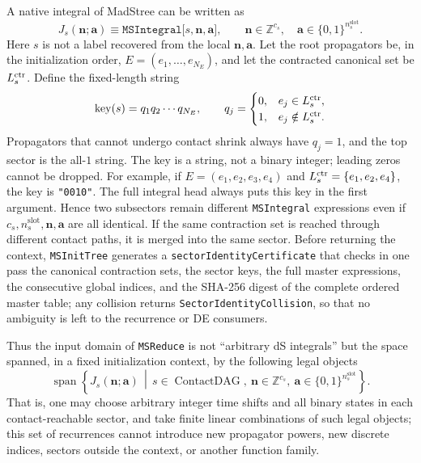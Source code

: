 \documentclass[11pt,a4paper]{article}
\begin{document}
A native integral of MadStree can be written as
\begin{equation}
 J_s(\bm n;\bm a)
 \equiv\texttt{MSIntegral[}s,\bm n,\bm a\texttt{]},
 \qquad
 \bm n\in\mathbb Z^{c_s},
 \quad
 \bm a\in\{0,1\}^{n_s^{\mathrm{slot}}}.
 \label{eq:MSIntegral-domain}
\end{equation}
Here $s$ is not a label recovered from the local $\bm n,\bm a$. Let the root propagators be, in the initialization order,
$E=(e_1,\ldots,e_{N_E})$, and let the contracted canonical set be $L_s^{\rm ctr}$. Define the fixed-length string
\begin{equation}
 \operatorname{key}(s)=q_1q_2\cdots q_{N_E},\qquad
 q_j=\begin{cases}0,&e_j\in L_s^{\rm ctr},\\1,&e_j\notin L_s^{\rm ctr}.
 \end{cases}
 \label{eq:sector-bit-string-key}
\end{equation}
Propagators that cannot undergo contact shrink always have $q_j=1$, and the top sector is the all-$1$ string. The key is a string, not a binary integer; leading zeros cannot be dropped. For example, if $E=(e_1,e_2,e_3,e_4)$ and $L_s^{\rm ctr}=\{e_1,e_2,e_4\}$, the key is \texttt{"0010"}. The full integral head always puts this key in the first argument. Hence two subsectors remain different \texttt{MSIntegral} expressions even if $c_s,n_s^{\mathrm{slot}},\bm n,\bm a$ are all identical. If the same contraction set is reached through different contact paths, it is merged into the same sector. Before returning the context, \texttt{MSInitTree} generates a \texttt{sectorIdentityCertificate} that checks in one pass the canonical contraction sets, the sector keys, the full master expressions, the consecutive global indices, and the SHA-256 digest of the complete ordered master table; any collision returns \texttt{SectorIdentityCollision}, so that no ambiguity is left to the recurrence or DE consumers.

Thus the input domain of \texttt{MSReduce} is not ``arbitrary dS integrals'' but the space spanned, in a fixed initialization context, by the following legal objects
\begin{equation}
 \boxed{
 \operatorname{span}\!\left\{
 J_s(\bm n;\bm a)\,\middle|\,
 s\in\operatorname{ContactDAG},\
 \bm n\in\mathbb Z^{c_s},\
 \bm a\in\{0,1\}^{n_s^{\mathrm{slot}}}
 \right\}.
 }
 \label{eq:MSReduce-domain}
\end{equation}
That is, one may choose arbitrary integer time shifts and all binary states in each contact-reachable sector, and take finite linear combinations of such legal objects; this set of recurrences cannot introduce new propagator powers, new discrete indices, sectors outside the context, or another function family.
\end{document}
